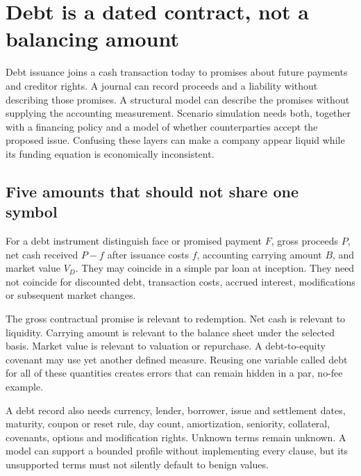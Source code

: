 \chapter[Debt contracts and financing]{Debt is a dated contract, not a balancing amount}
\label{sim:debt}

Debt issuance joins a cash transaction today to promises about future payments and creditor rights. A journal can record proceeds and a liability without describing those promises. A structural model can describe the promises without supplying the accounting measurement. Scenario simulation needs both, together with a financing policy and a model of whether counterparties accept the proposed issue. Confusing these layers can make a company appear liquid while its funding equation is economically inconsistent.

\section{Five amounts that should not share one symbol}
For a debt instrument distinguish face or promised payment $F$, gross proceeds $P$, net cash received $P-f$ after issuance costs $f$, accounting carrying amount $B$, and market value $V_D$. They may coincide in a simple par loan at inception. They need not coincide for discounted debt, transaction costs, accrued interest, modifications or subsequent market changes.

The gross contractual promise is relevant to redemption. Net cash is relevant to liquidity. Carrying amount is relevant to the balance sheet under the selected basis. Market value is relevant to valuation or repurchase. A debt-to-equity covenant may use yet another defined measure. Reusing one variable called debt for all of these quantities creates errors that can remain hidden in a par, no-fee example.

A debt record also needs currency, lender, borrower, issue and settlement dates, maturity, coupon or reset rule, day count, amortization, seniority, collateral, covenants, options and modification rights. Unknown terms remain unknown. A model can support a bounded profile without implementing every clause, but its unsupported terms must not silently default to benign values.

